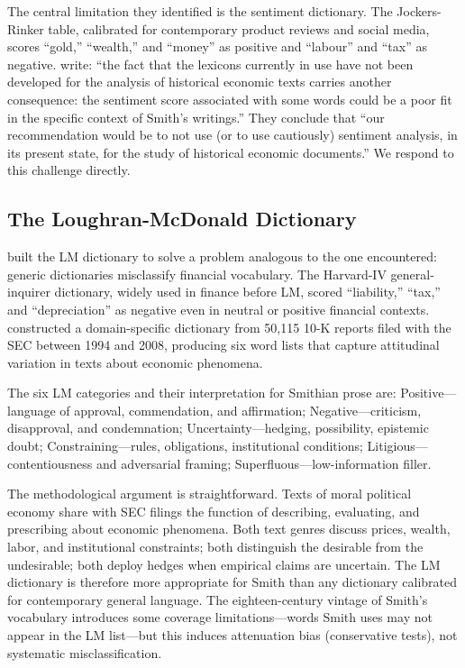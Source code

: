 \documentclass[12pt,a4paper]{article}
\begin{document}
The central limitation they identified is the sentiment dictionary.
The Jockers-Rinker table, calibrated for contemporary product reviews
and social media, scores ``gold,'' ``wealth,'' and ``money'' as positive
and ``labour'' and ``tax'' as negative.
\citeauthor{Ballandonne2023} \citeyearpar[p.~23]{Ballandonne2023} write:
``the fact that the lexicons currently in use have not been developed
for the analysis of historical economic texts carries another consequence:
the sentiment score associated with some words could be a poor fit in
the specific context of Smith's writings.''
They conclude that ``our recommendation would be to not use (or to use
cautiously) sentiment analysis, in its present state, for the study of
historical economic documents.''
We respond to this challenge directly.

\subsection{The Loughran-McDonald Dictionary}

\citet{LoughranMcDonald2011} built the LM dictionary to solve a problem
analogous to the one \citeauthor{Ballandonne2023} encountered: generic
dictionaries misclassify financial vocabulary.
The Harvard-IV general-inquirer dictionary, widely used in finance
before LM, scored ``liability,'' ``tax,'' and ``depreciation'' as negative
even in neutral or positive financial contexts.
\citeauthor{LoughranMcDonald2011} constructed a domain-specific
dictionary from 50,115 10-K reports filed with the SEC between 1994
and 2008, producing six word lists that capture attitudinal variation in
texts about economic phenomena.

The six LM categories and their interpretation for Smithian prose are:
Positive---language of approval, commendation, and affirmation;
Negative---criticism, disapproval, and condemnation;
Uncertainty---hedging, possibility, epistemic doubt;
Constraining---rules, obligations, institutional conditions;
Litigious---contentiousness and adversarial framing;
Superfluous---low-information filler.

The methodological argument is straightforward.
Texts of moral political economy share with SEC filings the function of
describing, evaluating, and prescribing about economic phenomena.
Both text genres discuss prices, wealth, labor, and institutional
constraints; both distinguish the desirable from the undesirable; both
deploy hedges when empirical claims are uncertain.
The LM dictionary is therefore more appropriate for Smith than any
dictionary calibrated for contemporary general language.
The eighteen-century vintage of Smith's vocabulary introduces some
coverage limitations---words Smith uses may not appear in the LM
list---but this induces attenuation bias (conservative tests), not
systematic misclassification.
\end{document}
